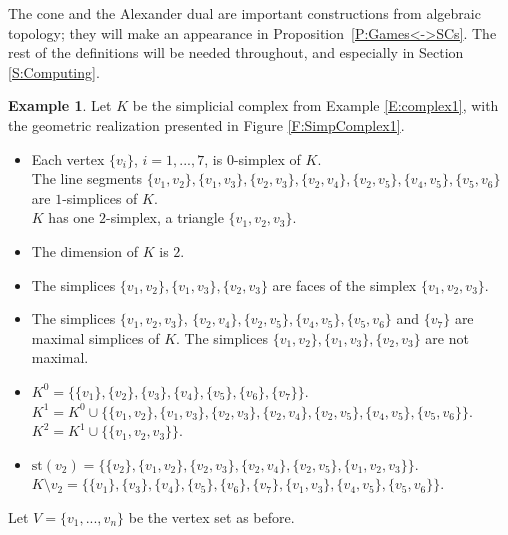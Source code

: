 \documentclass[11pt]{amsart}
\theoremstyle{plain}
\theoremstyle{definition}
\newtheorem{example}[thm]{Example}
\theoremstyle{remark}
\newcommand{\refP}[1]{Proposition~\ref{P:#1}}
\begin{document}
The cone and the Alexander dual are important constructions from algebraic topology; they will make an appearance in \refP{Games<->SCs}. The rest of the definitions will be needed throughout, and especially in Section \ref{S:Computing}.

\begin{example}\label{E:complex2}
Let $K$ be the simplicial complex from Example \ref{E:complex1}, with the geometric realization presented in Figure \ref{F:SimpComplex1}.
\begin{itemize}
\item Each vertex $\{v_i\}$, $i=1, ..., 7$, is $0$-simplex of $K$.\\
The line segments $\{v_1, v_2\}, \{v_1, v_3\}, \{v_2, v_3\}, \{v_2, v_4\}, \{v_2, v_5\}, \{v_4, v_5\}, \{v_5, v_6\}$ are $1$-simplices of $K$.\\
$K$ has one $2$-simplex, a triangle $\{v_1, v_2, v_3\}$.
\item The dimension of $K$ is $2$.
\item The simplices $\{v_1, v_2\}, \{v_1, v_3\}, \{v_2, v_3\}$ are faces of the simplex $\{v_1, v_2, v_3\}$.
\item The simplices $\{v_1, v_2, v_3\}$, $\{v_2, v_4\}, \{v_2, v_5\}, \{v_4, v_5\}, \{v_5, v_6\}$ and $\{v_7\}$ are maximal simplices of $K$. The simplices $\{v_1, v_2\}, \{v_1, v_3\}, \{v_2, v_3\}$ are not maximal.
\item $K^0=\{\{v_1\}, \{v_2\}, \{v_3\}, \{v_4\}, \{v_5\},\{v_6\}, \{v_7\}\}.$\\
$K^1=K^0\cup \{\{v_1, v_2\}, \{v_1, v_3\}, \{v_2, v_3\}, \{v_2, v_4\}, \{v_2, v_5\}, \{v_4, v_5\}, \{v_5, v_6\}\}.$\\
$K^2=K^1 \cup \{\{v_1, v_2, v_3\}\}.$
\item $\text{st}(v_2)=\{\{v_2\}, \{v_1, v_2\}, \{v_2, v_3\}, \{v_2, v_4\}, \{v_2, v_5\}, \{v_1, v_2, v_3\}\}$.\\
$K\setminus v_2 = \{\{v_1\}, \{v_3\}, \{v_4\}, \{v_5\}, \{v_6\}, \{v_7\}, \{v_1, v_3\}, \{v_4, v_5\}, \{v_5, v_6\}\}$.
\end{itemize}
\end{example}


Let $V=\{v_1, ..., v_n\}$ be the vertex set as before.
\end{document}

